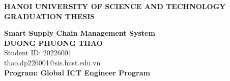 \documentclass[Main.tex]{subfiles}
\begin{document}
\begin{titlepage}
\thispagestyle{empty}
\begin{center}

{\textbf{\large{HANOI UNIVERSITY OF SCIENCE AND TECHNOLOGY }}}\\[4cm]

{\textbf{\huge{GRADUATION THESIS}}}\\[1cm]
{\textbf{\Large{Smart Supply Chain Management System}}\\[1cm]

{\textbf{\large{DUONG PHUONG THAO}}}\\
{\large{Student ID: 20226001}}\\
{\large{thao.dp226001@sis.hust.edu.vn}}\\[0.5cm]

{\textbf{\large{Program: Global ICT Engineer Program}}}\\

\vspace{4cm}
\begin{table}[H]
\centering
{}
\end{table}}
\end{center}



\end{titlepage}
\end{document}
